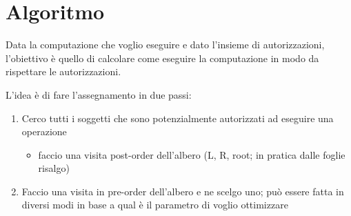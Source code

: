 \documentclass{report}
\begin{document}
\section{Algoritmo}
Data la computazione che voglio eseguire e dato l'insieme di autorizzazioni, l'obiettivo 
è quello di calcolare come eseguire la computazione in modo da rispettare le autorizzazioni.

\noindent L'idea è di fare l'assegnamento in due passi:
\begin{enumerate}
    \item Cerco tutti i soggetti che sono potenzialmente autorizzati ad eseguire una operazione 
    \begin{itemize}
        \item faccio una visita post-order dell'albero (L, R, root; in pratica dalle foglie risalgo) 
    \end{itemize}
    \item Faccio una visita in pre-order dell'albero e ne scelgo uno; può essere fatta in diversi modi in base a qual è il parametro di voglio ottimizzare
\end{enumerate}
\end{document}
